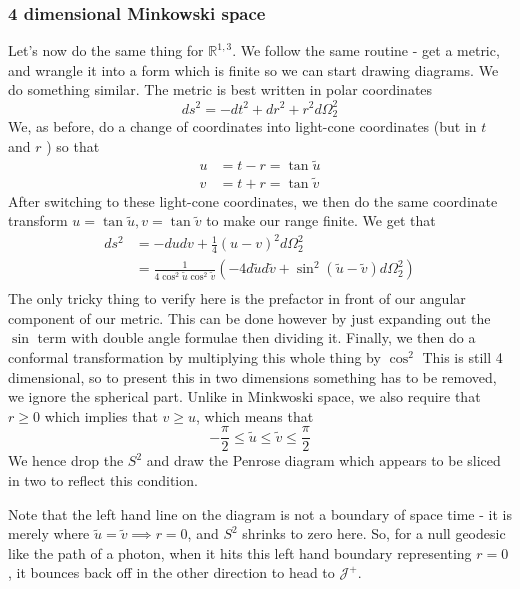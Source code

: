\subsubsection{4 dimensional Minkowski space} 
Let's now do the same thing 
for $ \mathbb{ R} ^{ 1, 3 } $.
We follow the same routine - get a metric, 
and wrangle it into a form which is finite so we 
can start drawing diagrams. 
We do something similar. 
The metric is best written in 
polar coordinates 
\[
 ds ^ 2 = - dt ^ 2 + d r ^ 2 + r ^ 2 d \Omega^ 2 _ 2 
\] We, as before, 
do a change of coordinates into light-cone 
coordinates (but in $ t $ and $ r $ ) so that 
\begin{align*}
	u &=  t - r = \tan \tilde{ u }   \\
	v &=  t + r  =  \tan \tilde{ v } 
\end{align*}
After switching to these light-cone coordinates, 
we then do the same coordinate transform $ u  = \tan \tilde{ u } , 
v  = \tan \tilde{ v }  $ to make our range finite. 
We get that  
\begin{align*}
	ds ^ 2 &=  - d u dv + \frac{1}{4 } ( u - v ) ^ 2 d \Omega_ 2 ^ 2  \\
	       &=  \frac{1}{4 \cos^ 2 \tilde{ u } \cos ^ 2 \tilde{ v }   } \left(  
	       - 4 d \tilde{ u } d \tilde{ v } + \sin ^ 2 ( \tilde{ u } - \tilde{ v } ) d \Omega _ 2 ^ 2     \right)  \\
\end{align*}
The only tricky thing to verify here is the prefactor in front of 
our angular component of our metric. This can be
done however by just expanding out the $ \sin $ term with double 
angle formulae then dividing it. 
Finally, we then do a conformal transformation by multiplying this 
whole thing by $ \cos ^ 2 $
This is still 4 dimensional, so to present 
this in two dimensions something has to be removed, we ignore the spherical part. 
Unlike in Minkwoski space, we also require that $ r \geq 0 $ which implies that 
$ v \geq u $, which means that 
\[
  - \frac{\pi}{2 } \leq \tilde{ u } \leq \tilde{ v } \leq \frac{\pi}{2 }   
\] We hence drop the $ S ^ 2 $ and draw the Penrose diagram which 
appears to be sliced in two to reflect this condition. 

Note that the left hand line on the diagram 
is not a boundary of space time - it is 
merely where $ \tilde{ u }  = \tilde{ v } \implies r = 0   $, 
and $ S ^ 2$ shrinks to zero here. So, for a null geodesic 
like the path of a photon, when it hits this 
left hand boundary representing $ r = 0 $, it bounces back off 
in the other direction to head to  $\mathscr{J} ^ + $. 

